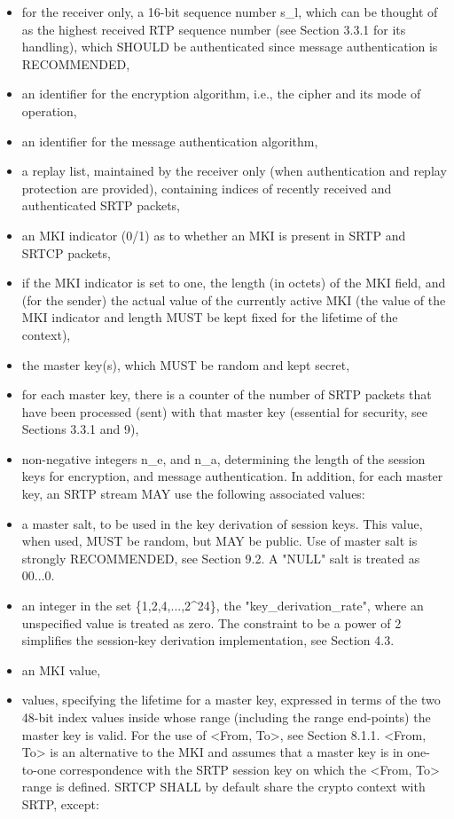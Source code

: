 \documentclass{article}
\begin{document}
\begin{itemize}
\item for the receiver only, a 16-bit sequence number s\_l, which can be thought of as the highest received RTP sequence number (see Section 3.3.1 for its handling), which SHOULD be authenticated since message authentication is RECOMMENDED,
\item an identifier for the encryption algorithm, i.e., the cipher and its mode of operation,
\item an identifier for the message authentication algorithm,
\item a replay list, maintained by the receiver only (when authentication and replay protection are provided), containing indices of recently received and authenticated SRTP packets,
\item an MKI indicator (0/1) as to whether an MKI is present in SRTP and SRTCP packets,
\item if the MKI indicator is set to one, the length (in octets) of the MKI field, and (for the sender) the actual value of the currently active MKI (the value of the MKI indicator and length MUST be kept fixed for the lifetime of the context),
\item the master key(s), which MUST be random and kept secret,
\item for each master key, there is a counter of the number of SRTP packets that have been processed (sent) with that master key (essential for security, see Sections 3.3.1 and 9),
\item non-negative integers n\_e, and n\_a, determining the length of the session keys for encryption, and message authentication.
In addition, for each master key, an SRTP stream MAY use the following associated values:

\item a master salt, to be used in the key derivation of session keys. This value, when used, MUST be random, but MAY be public.  Use of master salt is strongly RECOMMENDED, see Section 9.2.  A "NULL" salt is treated as 00...0.
\item an integer in the set \{1,2,4,...,2\textasciicircum{}24\}, the "key\_derivation\_rate", where an unspecified value is treated as zero.  The constraint to be a power of 2 simplifies the session-key derivation implementation, see Section 4.3.
\item an MKI value,
\item <From, To> values, specifying the lifetime for a master key, expressed in terms of the two 48-bit index values inside whose range (including the range end-points) the master key is valid. For the use of <From, To>, see Section 8.1.1.  <From, To> is an alternative to the MKI and assumes that a master key is in one- to-one correspondence with the SRTP session key on which the <From, To> range is defined.
SRTCP SHALL by default share the crypto context with SRTP, except:


\end{itemize}
\end{document}
